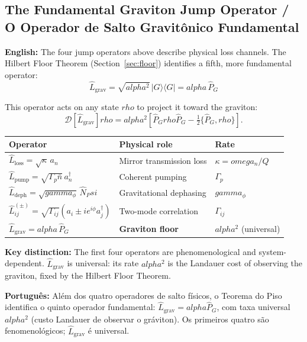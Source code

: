 \documentclass[12pt,a4paper]{article}
\def\Psi{Psi}%
\def\alpha{alpha}%
\def\gamma{gamma}%
\def\rho{rho}%
\def\omega{omega}%
\begin{document}
\subsection{The Fundamental Graviton Jump Operator / O Operador de Salto Gravitônico Fundamental}

\textbf{English:} The four jump operators above describe physical loss channels. The Hilbert Floor Theorem (Section~\ref{sec:floor}) identifies a fifth, more fundamental operator:
\begin{equation}
\boxed{\hat{L}_{\mathrm{grav}} = \sqrt{\alpha^2}\,|G\rangle\langle G| = \alpha\,\hat{P}_G}
\end{equation}

This operator acts on any state $\rho$ to project it toward the graviton:
\begin{equation}
\mathcal{D}[\hat{L}_{\mathrm{grav}}]\rho = \alpha^2\!\left[\hat{P}_G\rho\hat{P}_G - \tfrac{1}{2}\{\hat{P}_G,\rho\}\right].
\end{equation}

\begin{center}
\renewcommand{\arraystretch}{1.3}
\begin{tabular}{lll}
\toprule
Operator & Physical role & Rate \\
\midrule
$\hat{L}_{\mathrm{loss}} = \sqrt{\kappa}\,a_n$                             & Mirror transmission loss    & $\kappa = \omega_n/Q$ \\
$\hat{L}_{\mathrm{pump}} = \sqrt{\Gamma_p\bar{n}}\,a_n^\dagger$            & Coherent pumping            & $\Gamma_p$ \\
$\hat{L}_{\mathrm{deph}} = \sqrt{\gamma_\phi}\,\hat{N}_\Psi$               & Gravitational dephasing     & $\gamma_\phi$ \\
$\hat{L}_{ij}^{(\pm)} = \sqrt{\Gamma_{ij}}(a_i \pm ie^{i\phi}a_j^\dagger)$ & Two-mode correlation        & $\Gamma_{ij}$ \\
$\hat{L}_{\mathrm{grav}} = \alpha\,\hat{P}_G$                              & \textbf{Graviton floor}     & $\alpha^2$ (universal) \\
\bottomrule
\end{tabular}
\end{center}

\textbf{Key distinction:} The first four operators are phenomenological and system-dependent. $\hat{L}_{\mathrm{grav}}$ is universal: its rate $\alpha^2$ is the Landauer cost of observing the graviton, fixed by the Hilbert Floor Theorem.

\textbf{Português:} Além dos quatro operadores de salto físicos, o Teorema do Piso identifica o quinto operador fundamental: $\hat{L}_{\text{grav}} = \alpha\hat{P}_G$, com taxa universal $\alpha^2$ (custo Landauer de observar o gráviton). Os primeiros quatro são fenomenológicos; $\hat{L}_{\text{grav}}$ é universal.
\end{document}
